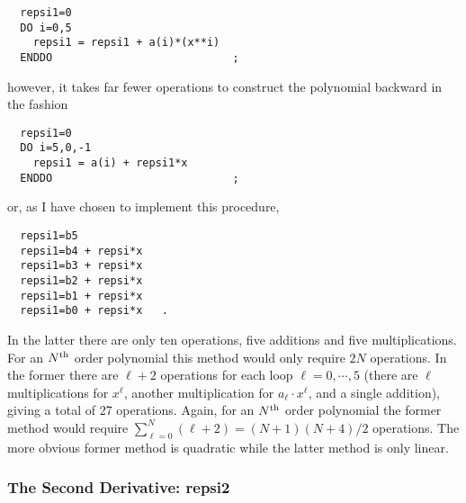 \documentclass[preprint,12pt,eqsecnum,nofootinbib,amsmath,amssymb]{revtex4}
\begin{document}
{
\baselineskip12pt
\begin{verbatim}
  repsi1=0
  DO i=0,5
    repsi1 = repsi1 + a(i)*(x**i)
  ENDDO                            ;
\end{verbatim}
}

\noindent
however, it takes far fewer operations to 
construct the polynomial backward in the
fashion 

{
\baselineskip12pt
\begin{verbatim}
  repsi1=0
  DO i=5,0,-1
    repsi1 = a(i) + repsi1*x
  ENDDO                            ;
\end{verbatim}
}

\noindent
or, as I have chosen to implement this procedure,

{
\baselineskip12pt
\begin{verbatim}
  repsi1=b5
  repsi1=b4 + repsi*x
  repsi1=b3 + repsi*x
  repsi1=b2 + repsi*x
  repsi1=b1 + repsi*x
  repsi1=b0 + repsi*x   .
\end{verbatim}
}

\noindent
In the latter there are only ten operations, five additions
and five multiplications. For an $N^{\rm th}$ order polynomial
this method would only require $2N$ operations. In the former 
there are $\ell+2$ operations for each loop $\ell=0, \cdots, 5$ 
(there are $\ell$ multiplications for $x^\ell$, another multiplication 
for $a_\ell \cdot x^\ell$, and a single addition), giving
a total of 27 operations. Again, for an $N^{\rm th}$ order
polynomial the former method would require $\sum_{\ell=0}^N
(\ell + 2) = (N+1)(N+4)/2$ operations. The more obvious former 
method is quadratic while the latter method is only linear.  

\subsubsection{The Second Derivative: repsi2}
\end{document}
